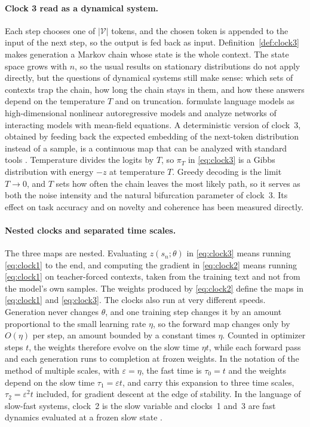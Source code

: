 \paragraph{Clock 3 read as a dynamical system.} Each step chooses one of $|\mathcal V|$ tokens, and the chosen token is appended to the input of the next step, so the output is fed back as input. Definition~\ref{def:clock3} makes generation a Markov chain whose state is the whole context. The state space grows with $n$, so the usual results on stationary distributions do not apply directly, but the questions of dynamical systems still make sense: which sets of contexts trap the chain, how long the chain stays in them, and how these answers depend on the temperature $T$ and on truncation. \citet{krishnamurthy2026stochastic} formulate language models as high-dimensional nonlinear autoregressive models and analyze networks of interacting models with mean-field equations. A deterministic version of clock~3, obtained by feeding back the expected embedding of the next-token distribution instead of a sample, is a continuous map that can be analyzed with standard tools \citep{jones2026chaos}. Temperature divides the logits by $T$, so $\pi_T$ in \eqref{eq:clock3} is a Gibbs distribution with energy $-z$ at temperature $T$. Greedy decoding is the limit $T\to0$, and $T$ sets how often the chain leaves the most likely path, so it serves as both the noise intensity and the natural bifurcation parameter of clock~3. Its effect on task accuracy \citep{renze2024effect} and on novelty and coherence \citep{peeperkorn2024temperature} has been measured directly.

\paragraph{Nested clocks and separated time scales.} The three maps are nested. Evaluating $z(s_n;\theta)$ in \eqref{eq:clock3} means running \eqref{eq:clock1} to the end, and computing the gradient in \eqref{eq:clock2} means running \eqref{eq:clock1} on teacher-forced contexts, taken from the training text and not from the model's own samples. The weights produced by \eqref{eq:clock2} define the maps in \eqref{eq:clock1} and \eqref{eq:clock3}. The clocks also run at very different speeds. Generation never changes $\theta$, and one training step changes it by an amount proportional to the small learning rate $\eta$, so the forward map changes only by $O(\eta)$ per step, an amount bounded by a constant times $\eta$. Counted in optimizer steps $t$, the weights therefore evolve on the slow time $\eta t$, while each forward pass and each generation runs to completion at frozen weights. In the notation of the method of multiple scales, with $\varepsilon=\eta$, the fast time is $\tau_0=t$ and the weights depend on the slow time $\tau_1=\varepsilon t$, and \citet{berthier2026multiple} carry this expansion to three time scales, $\tau_2=\varepsilon^2t$ included, for gradient descent at the edge of stability. In the language of slow-fast systems, clock~2 is the slow variable and clocks~1 and~3 are fast dynamics evaluated at a frozen slow state \citep{strogatz2018nonlinear}.

